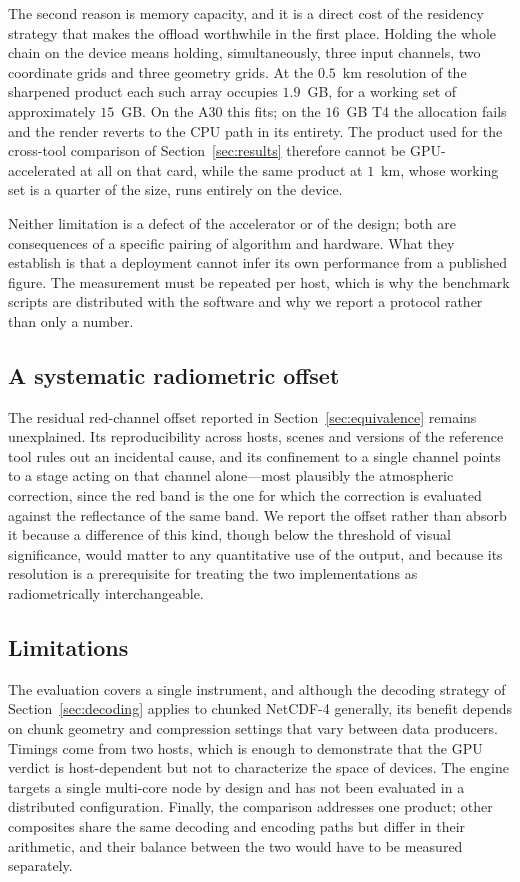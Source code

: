 \documentclass[11pt]{article}
\begin{document}
The second reason is memory capacity, and it is a direct cost of the residency
strategy that makes the offload worthwhile in the first place. Holding the
whole chain on the device means holding, simultaneously, three input channels,
two coordinate grids and three geometry grids. At the $0.5$~km resolution of
the sharpened product each such array occupies $1.9$~GB, for a working set of
approximately $15$~GB. On the A30 this fits; on the $16$~GB T4 the allocation
fails and the render reverts to the CPU path in its entirety. The product used
for the cross-tool comparison of Section~\ref{sec:results} therefore cannot be
GPU-accelerated at all on that card, while the same product at $1$~km, whose
working set is a quarter of the size, runs entirely on the device.

Neither limitation is a defect of the accelerator or of the design; both are
consequences of a specific pairing of algorithm and hardware. What they
establish is that a deployment cannot infer its own performance from a
published figure. The measurement must be repeated per host, which is why the
benchmark scripts are distributed with the software and why we report a
protocol rather than only a number.

\subsection{A systematic radiometric offset}
\label{sec:redbias}

The residual red-channel offset reported in Section~\ref{sec:equivalence}
remains unexplained. Its reproducibility across hosts, scenes and versions of
the reference tool rules out an incidental cause, and its confinement to a
single channel points to a stage acting on that channel alone---most plausibly
the atmospheric correction, since the red band is the one for which the
correction is evaluated against the reflectance of the same band. We report the
offset rather than absorb it because a difference of this kind, though below
the threshold of visual significance, would matter to any quantitative use of
the output, and because its resolution is a prerequisite for treating the two
implementations as radiometrically interchangeable.

\subsection{Limitations}
\label{sec:limitations}

The evaluation covers a single instrument, and although the decoding strategy
of Section~\ref{sec:decoding} applies to chunked NetCDF-4 generally, its
benefit depends on chunk geometry and compression settings that vary between
data producers. Timings come from two hosts, which is enough to demonstrate
that the GPU verdict is host-dependent but not to characterize the space of
devices. The engine targets a single multi-core node by design and has not been
evaluated in a distributed configuration. Finally, the comparison addresses one
product; other composites share the same decoding and encoding paths but
differ in their arithmetic, and their balance between the two would have to be
measured separately.
\end{document}

